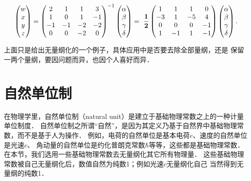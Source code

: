 \begin{small}
\begin{equation}\label{chunit-dim:eqn_dimensionless-1}
  \begin{pmatrix}
    w \\ x \\ y \\z
  \end{pmatrix} =
  \begin{pmatrix}
    2 & 1 & 1 & 3 \\
    1 & 0 & 1 &-1 \\
    -1&-1 &-2 &-2 \\
    0 & 0 &-2 & 0
  \end{pmatrix}^{-1}
  \begin{pmatrix}
    \alpha \\ \beta \\ \gamma \\ \delta
  \end{pmatrix} = \ \dfrac{\bf 1}{\bf 2}
  \begin{pmatrix}
    1 & 1 & 1 & 0 \\
    -3& 1 & -5& 4 \\
    0 & 0 & 0 & -1 \\
    1 & -1& 1 & -1
  \end{pmatrix}\begin{pmatrix}
  \alpha \\ \beta \\ \gamma \\ \delta
  \end{pmatrix} .
\end{equation}
\end{small}

上面只是给出无量纲化的一个例子，具体应用中是否要去除全部量纲，还是
保留一两个量纲，要因问题而异，也因个人喜好而异．

\section{自然单位制}\label{chunit-dim:sec_nature-units}
在物理学里，自然单位制（natural unit）是建立于基础物理常数之上的一种计量单位制度．
自然单位制之所谓“自然”，是因为其定义乃基于自然界中基础物理常数，而不是基于人为操作．
例如，电荷的自然单位是基本电荷$e$、速度的自然单位是光速$c$、
角动量的自然单位是约化普朗克常数$\hbar$等等，这些都是基础物理常数．
{在本节，我们选用一些基础物理常数去无量纲化其它所有物理量．}
这些基础物理常数被自己无量纲化后，数值自然为纯数1；例如光速$c$无量纲化自己
当然得到无量纲的纯数1．


